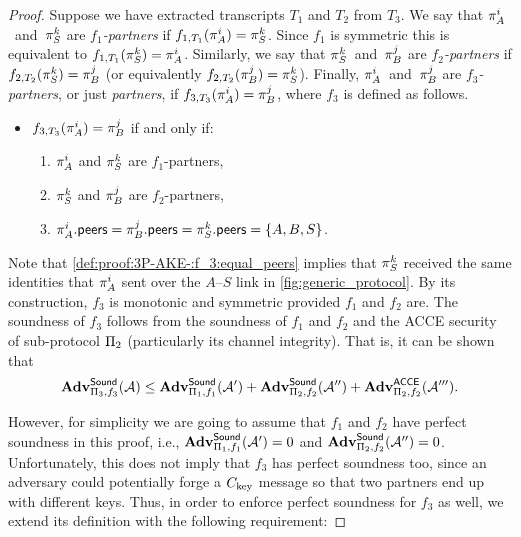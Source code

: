 \begin{proof}
Suppose we have extracted transcripts $T_1$ and $T_2$ from $T_3$.
We say that $\oracle[A][i]$~and~$\oracle[S][k]$ are \emph{$f_1$-partners} if $f_{1,T_1}(\oracle[A][i]) = \oracle[S][k]$.
Since $f_1$ is symmetric this is equivalent to $f_{1,T_1}(\oracle[S][k]) = \oracle[A][i]$.
Similarly,
we say that $\oracle[S][k]$~and~$\oracle[B][j]$ are \emph{$f_2$-partners} if $f_{2,T_2}(\oracle[S][k]) = \oracle[B][j]$ 
(or equivalently $f_{2,T_2}(\oracle[B][j]) = \oracle[S][k]$).
Finally,
$\oracle[A][i]$~and~$\oracle[B][j]$ are \emph{$f_3$-partners},
or just \emph{partners},
if $f_{3,T_3}(\oracle[A][i]) = \oracle[B][j]$,
where $f_3$ is defined as follows.

\item
\begin{itemize}
\item 
$f_{3,T_3}(\oracle[A][i]) = \oracle[B][j]$ if and only if:

\begin{enumerate}
	\item $\oracle[A][i]$ and $\oracle[S][k]$ are $f_1$-partners,
	
	\item $\oracle[S][k]$ and $\oracle[B][j]$ are $f_2$-partners,
	
	\item $\oracle[A][i].\peers = \oracle[B][j].\peers = \oracle[S][k].\peers = \lbrace A, B, S \rbrace$. \label{def:proof:3P-AKE-:f_3:equal_peers}
	


\end{enumerate}
\end{itemize}

Note that \cref{def:proof:3P-AKE-:f_3:equal_peers}  implies that $\oracle[S][k]$ received the same identities that $\oracle[A][i]$ sent  over the $A$--$S$ link in \cref{fig:generic_protocol}. 
By its construction,
$f_3$ is monotonic and symmetric provided $f_1$ and $f_2$ are.
The soundness of $f_3$ follows from the soundness of $f_1$ and $f_2$ and the ACCE security of sub-protocol $\mathrm{\Pi}_2$
(particularly its channel integrity).
That is,
it can be shown that 
\begin{equation}\label{eq:proof:3P-AKE-:f_3:soundness}
	\mathbf{Adv}_{\mathrm{\Pi}_3,f_3}^{\mathsf{Sound}}(\mathcal{A}) 
		\leq \mathbf{Adv}_{\mathrm{\Pi}_1,f_1}^{\mathsf{Sound}}(\mathcal{A}') 
			+ \mathbf{Adv}_{\mathrm{\Pi}_2,f_2}^{\mathsf{Sound}}(\mathcal{A}'') 
			+ \mathbf{Adv}_{\mathrm{\Pi}_2,f_2}^{\mathsf{ACCE}}(\mathcal{A}''') .
\end{equation}

However,
for simplicity we are going to assume that $f_1$ and $f_2$ have perfect soundness in this proof,
i.e., $\mathbf{Adv}_{\mathrm{\Pi}_1,f_1}^{\mathsf{Sound}}(\mathcal{A}') = 0$ and $\mathbf{Adv}_{\mathrm{\Pi}_2,f_2}^{\mathsf{Sound}}(\mathcal{A}'') = 0$.
Unfortunately,
this does not imply that $f_3$ has perfect soundness too,
since an adversary could potentially forge a $C_{\mathrm{key}}$ message so that two partners end up with different keys.
Thus,
in order to enforce perfect soundness for $f_3$ as well,
we extend its definition with the following requirement:


\end{proof}
